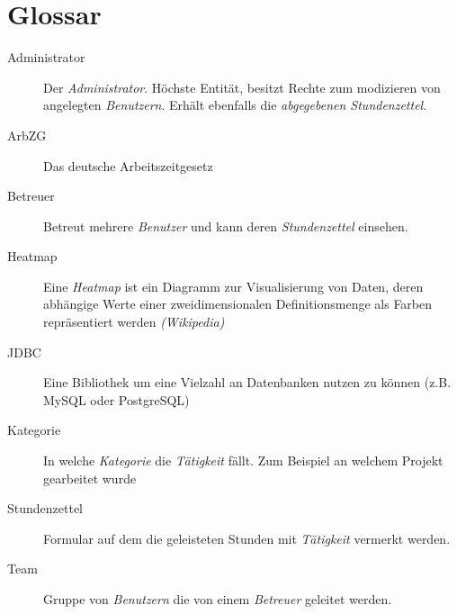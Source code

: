 \section{Glossar}
\begin{description}
	\item[Administrator] Der \emph{Administrator}. Höchste Entität, besitzt Rechte zum modizieren von angelegten \emph{Benutzern}.
	               Erhält ebenfalls die \emph{abgegebenen Stundenzettel}.

	\item[ArbZG] Das deutsche Arbeitszeitgesetz

	\item[Betreuer] Betreut mehrere \emph{Benutzer} und kann deren \emph{Stundenzettel} einsehen.

	\item[Heatmap] Eine \emph{Heatmap} ist ein Diagramm zur Visualisierung von Daten, deren abhängige Werte einer zweidimensionalen Definitionsmenge als Farben repräsentiert werden \emph{(Wikipedia)}

	\item[JDBC] Eine Bibliothek um eine Vielzahl an Datenbanken nutzen zu können (z.B. MySQL oder PostgreSQL)

	\item[Kategorie] In welche \emph{Kategorie} die \emph{Tätigkeit} fällt. Zum Beispiel an welchem Projekt gearbeitet wurde

	\item[Stundenzettel] Formular auf dem die geleisteten Stunden mit \emph{Tätigkeit} vermerkt werden.

	\item[Team] Gruppe von \emph{Benutzern} die von einem \emph{Betreuer} geleitet werden.

\end{description}
